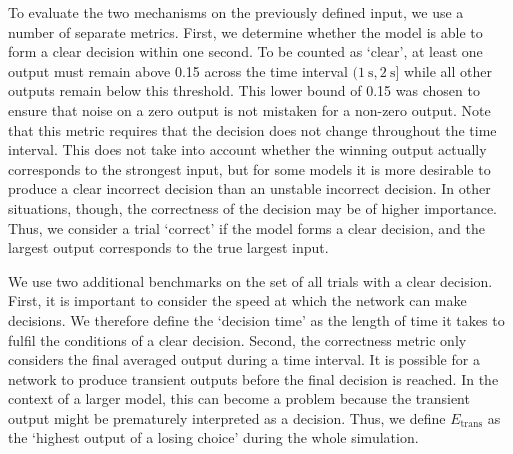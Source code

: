 \documentclass[10pt,letterpaper]{article}
\begin{document}
To evaluate the two mechanisms on the previously defined input, we use a number of separate metrics.
First, we determine whether the model is able to form a clear decision within one second.
To be counted as `clear', at least one output must remain above 0.15 across the time interval $(\SI{1}{\second}, \SI{2}{\second}]$ while all other outputs remain below this threshold. %
This lower bound of 0.15 was chosen to ensure that noise on a zero output is not mistaken for a non-zero output.
Note that this metric requires that the decision does not change throughout the time interval.
This does not take into account whether the winning output actually corresponds to the strongest input, but for some models it is more desirable to produce a clear incorrect decision than an unstable incorrect decision.
In other situations, though, the correctness of the decision may be of higher importance.
Thus, we consider a trial `correct' if the model forms a clear decision, and the largest output corresponds to the true largest input.

We use two additional benchmarks on the set of all trials with a clear decision.
First, it is important to consider the speed at which the network can make decisions.
We therefore define the `decision time' as the length of time it takes to fulfil the conditions of a clear decision.
Second, the correctness metric only considers the final averaged output during a time interval.
It is possible for a network to produce transient outputs before the final decision is reached.
In the context of a larger model, this can become a problem because the transient output might be prematurely interpreted as a decision.
Thus, we define $E_{\mathrm{trans}}$ as the `highest output of a losing choice' during the whole simulation.
\end{document}
